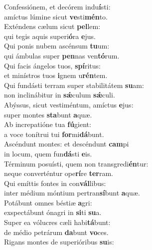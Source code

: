 \evenverse Confessiónem, et decórem indu\textbf{í}sti:~\*\\
\evenverse amíctus lúmine sicut \textbf{ve}sti\textbf{mén}to.\\
\oddverse Exténdens cælum sicut \textbf{pel}lem:~\*\\
\oddverse qui tegis aquis superi\textbf{ó}ra \textbf{e}jus.\\
\evenverse Qui ponis nubem ascénsum \textbf{tu}um:~\*\\
\evenverse qui ámbulas super \textbf{pen}nas ven\textbf{tó}rum.\\
\oddverse Qui facis ángelos tuos, \textbf{spí}ritus:~\*\\
\oddverse et minístros tuos \textbf{i}gnem u\textbf{rén}tem.\\
\evenverse Qui fundásti terram super stabilitátem \textbf{su}am:~\*\\
\evenverse non inclinábitur in \textbf{sǽ}culum \textbf{sǽ}culi.\\
\oddverse Abýssus, sicut vestiméntum, amíctus \textbf{e}jus:~\*\\
\oddverse super montes \textbf{sta}bunt \textbf{a}quæ.\\
\evenverse Ab increpatióne tua \textbf{fú}gient:~\*\\
\evenverse a voce tonítrui tui \textbf{for}mi\textbf{dá}bunt.\\
\oddverse Ascéndunt montes: et descéndunt \textbf{cam}pi~\*\\
\oddverse in locum, quem fun\textbf{dá}sti \textbf{e}is.\\
\evenverse Términum posuísti, quem non transgredi\textbf{én}tur:~\*\\
\evenverse neque converténtur ope\textbf{rí}re \textbf{ter}ram.\\
\oddverse Qui emíttis fontes in con\textbf{vál}libus:~\*\\
\oddverse inter médium móntium pertran\textbf{sí}bunt \textbf{a}quæ.\\
\evenverse Potábunt omnes béstiæ \textbf{a}gri:~\*\\
\evenverse exspectábunt ónagri in \textbf{si}ti \textbf{su}a.\\
\oddverse Super ea vólucres cæli habi\textbf{tá}bunt:~\*\\
\oddverse de médio petrárum \textbf{da}bunt \textbf{vo}ces.\\
\evenverse Rigans montes de superióribus \textbf{su}is:~\*\\
